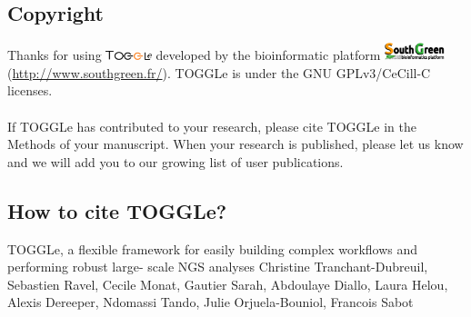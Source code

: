 \subsection{Copyright}

Thanks for using  \includegraphics[width=0.1\textwidth]{../img/toggleLogo2.png}  developed by the bioinformatic platform \includegraphics[width=0.13\textwidth]{../img/SGLogo.png} (\url{http://www.southgreen.fr/}). TOGGLe is under the GNU GPLv3/CeCill-C licenses. 
\\
\\
If TOGGLe has contributed to your research, please cite TOGGLe in the Methods of your manuscript. When your research is published, please let us know and we will add you to our growing list of user publications.

\subsection{How to cite TOGGLe?}
TOGGLe, a flexible framework for easily building complex workflows and performing robust large- scale NGS analyses
Christine Tranchant-Dubreuil, Sebastien Ravel, Cecile Monat, Gautier Sarah, Abdoulaye Diallo, Laura Helou, Alexis Dereeper, Ndomassi Tando, Julie Orjuela-Bouniol, Francois Sabot
